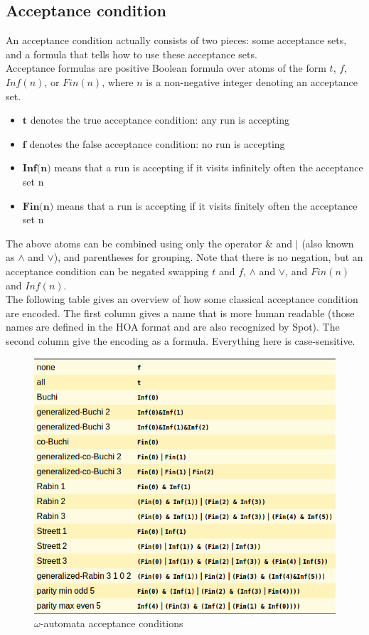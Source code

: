 \subsection{Acceptance condition}
An acceptance condition actually consists of two pieces: some acceptance sets, and a formula that tells
how to use these acceptance sets.\\

Acceptance formulas are positive Boolean formula over atoms of the form $t$, $f$, $Inf(n)$, or $Fin(n)$,
where $n$ is a non-negative integer denoting an acceptance set.
\begin{itemize}
 \item $\textbf{t}$ denotes the true acceptance condition: any run is accepting
 \item $\textbf{f}$ denotes the false acceptance condition: no run is accepting
 \item $\textbf{Inf(n)}$ means that a run is accepting if it visits infinitely often the acceptance set n
 \item $\textbf{Fin(n)}$ means that a run is accepting if it visits finitely often the acceptance set n
\end{itemize}

The above atoms can be combined using only the operator $\&$ and $|$ (also known as $\land$ and $\lor$), and
parentheses for grouping. Note that there is no negation, but an acceptance condition can be negated
swapping $t$ and $f$, $\land$ and $\lor$, and $Fin(n)$ and $Inf(n)$.\\

The following table gives an overview of how some classical acceptance condition are encoded. The first
column gives a name that is more human readable (those names are defined in the HOA \cite{3} format and
are also recognized by Spot). The second column give the encoding as a formula. Everything here is
case-sensitive.

\begin{figure}[H]
 \centering
 \includegraphics[scale=0.6]{img/acc_conds.png}
 \caption{$\omega$-automata acceptance conditions \cite{8}}
 \label{fig:acc_conds}
\end{figure}

